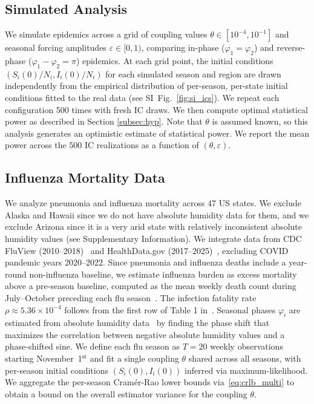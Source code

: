 \documentclass[11pt]{article}
\begin{document}
\subsection{Simulated Analysis}\label{subsec:sim_crlb}
We simulate epidemics across a grid of coupling values $\theta \in
[10^{-4}, 10^{-1}]$ and seasonal forcing amplitudes $\varepsilon \in
[0, 1)$, comparing in-phase ($\varphi_1 = \varphi_2$) and
  reverse-phase ($\varphi_1 - \varphi_2 = \pi$) epidemics. At each
  grid point, the initial conditions $(S_i(0)/N_i, I_i(0)/N_i)$ for
  each simulated season and region are drawn independently from the
  empirical distribution of per-season, per-state initial conditions
  fitted to the real data (see SI~Fig.~\ref{fig:si_ics}). We repeat
  each configuration 500 times with fresh IC draws. We then compute
  optimal statistical power as described in Section
  \ref{subsec:hyp}. Note that $\theta$ is assumed known, so this
  analysis generates an optimistic estimate of statistical power. We
  report the mean power across the 500 IC realizations as a function
  of $(\theta, \varepsilon)$.

\subsection{Influenza Mortality Data}\label{subsec:real_data}
We analyze pneumonia and influenza mortality across 47 US states.  We
exclude Alaska and Hawaii since we do not have absolute humidity data
for them, and we exclude Arizona since it is a very arid state with
relatively inconsistent absolute humidity values (see Supplementary
Information). We integrate data from CDC FluView
(2010--2018)~\citep{cdcfluview2024} and HealthData.gov
(2017--2025)~\citep{healthdatagov2025}, excluding COVID pandemic years
2020--2022. Since pneumonia and influenza deaths include a year-round
non-influenza baseline, we estimate influenza burden as excess
mortality above a pre-season baseline, computed as the mean weekly
death count during July--October preceding each flu
season~\citep{serfling1963, viboud2006}. The infection fatality rate
$\rho \approx 5.36 \times 10^{-4}$ follows from the first row of Table
1 in~\citep{rolfes2018}. Seasonal phases $\varphi_i$ are estimated
from absolute humidity data~\citep{daon2025, shaman2009} by finding
the phase shift that maximizes the correlation between negative
absolute humidity values and a phase-shifted sine. We define each flu
season as $T = 20$ weekly observations starting
November~1$^{\text{st}}$ and fit a single coupling $\theta$ shared
across all seasons, with per-season initial conditions $(S_i(0),
I_i(0))$ inferred via maximum-likelihood. We aggregate the per-season
Cram\'er-Rao lower bounds via~\eqref{eq:crlb_multi} to obtain a bound
on the overall estimator variance for the coupling $\theta$.
 
\end{document}
